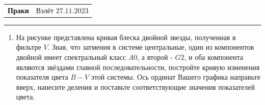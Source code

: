 \documentclass[12pt]{article}
\begin{document}
\begin{tabularx}{\textwidth}{Xr}
{\Large \textbf{Праки}} & Взлёт $27.11.2023$ \\
\end{tabularx}
\noindent\rule{\textwidth}{0.4pt}
\begin{enumerate}
    \item На рисунке представлена кривая блеска двойной звезды, полученная в фильтре $V$. Зная, что затмения в системе центральные, один из компонентов двойной имеет спектральный класс $A0$, а второй - $G2$, и оба компонента являются звёздами главной последовательности, постройте кривую изменения показателя цвета $B - V$ этой системы. Ось ординат Вашего графика направьте вверх, нанесите деления и поставьте соответствующие значения показателей цвета. \\

    \begin{figure}[h]
        \centering
    \end{figure}


\end{enumerate}
\end{document}
